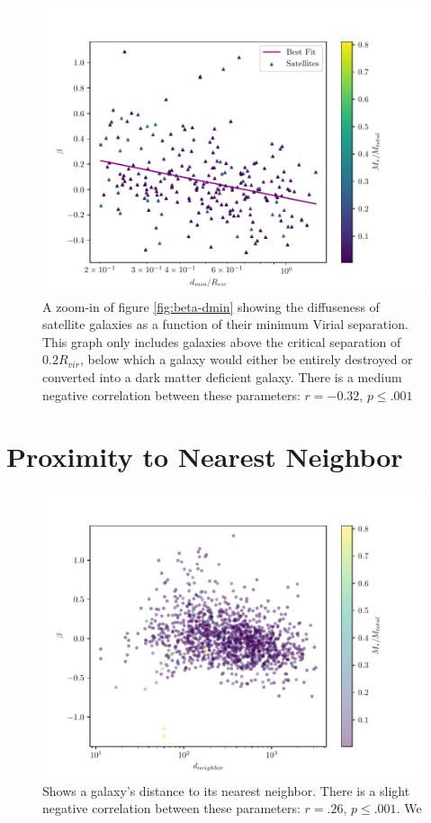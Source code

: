 \begin{figure}
    \centering
    \includegraphics*[width=\textwidth*2/3]{figs/me/beta-dmin-fit.pdf}
    \caption{A zoom-in of figure \ref{fig:beta-dmin} showing the diffuseness of satellite galaxies as a function of their minimum Virial separation. This graph only includes galaxies above the critical separation of $0.2 R_{vir}$, below which a galaxy would either be entirely destroyed or converted into a dark matter deficient galaxy. There is a medium negative correlation between these parameters: $r=-0.32$, $p \leq .001$}
    \label{fig:beta-dmin-fit}
\end{figure}


\section{Proximity to Nearest Neighbor}

\begin{figure}
    \centering
    \includegraphics*[width=\textwidth*2/3]{figs/me/beta-d_nearest.pdf}
    \caption{Shows a galaxy's distance to its nearest neighbor. There is a slight negative correlation between these parameters: $r = .26$, $p \leq .001$. We }
\end{figure}

